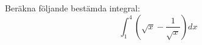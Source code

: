 \documentclass[11pt]{article}
\begin{document}
Beräkna följande bestämda integral:
\[
    \int_1^4 \left(\sqrt{x} - \frac{1}{\sqrt{x}}\right) dx
\]
\end{document}
